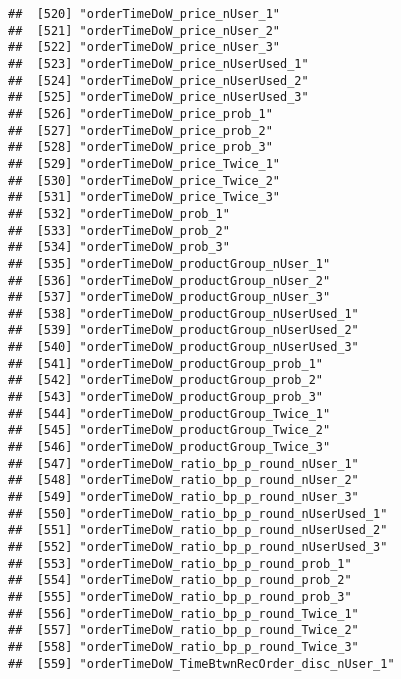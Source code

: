 \documentclass[10pt]{report}
\begin{document}
\begin{verbatim}
##  [520] "orderTimeDoW_price_nUser_1"                           
##  [521] "orderTimeDoW_price_nUser_2"                           
##  [522] "orderTimeDoW_price_nUser_3"                           
##  [523] "orderTimeDoW_price_nUserUsed_1"                       
##  [524] "orderTimeDoW_price_nUserUsed_2"                       
##  [525] "orderTimeDoW_price_nUserUsed_3"                       
##  [526] "orderTimeDoW_price_prob_1"                            
##  [527] "orderTimeDoW_price_prob_2"                            
##  [528] "orderTimeDoW_price_prob_3"                            
##  [529] "orderTimeDoW_price_Twice_1"                           
##  [530] "orderTimeDoW_price_Twice_2"                           
##  [531] "orderTimeDoW_price_Twice_3"                           
##  [532] "orderTimeDoW_prob_1"                                  
##  [533] "orderTimeDoW_prob_2"                                  
##  [534] "orderTimeDoW_prob_3"                                  
##  [535] "orderTimeDoW_productGroup_nUser_1"                    
##  [536] "orderTimeDoW_productGroup_nUser_2"                    
##  [537] "orderTimeDoW_productGroup_nUser_3"                    
##  [538] "orderTimeDoW_productGroup_nUserUsed_1"                
##  [539] "orderTimeDoW_productGroup_nUserUsed_2"                
##  [540] "orderTimeDoW_productGroup_nUserUsed_3"                
##  [541] "orderTimeDoW_productGroup_prob_1"                     
##  [542] "orderTimeDoW_productGroup_prob_2"                     
##  [543] "orderTimeDoW_productGroup_prob_3"                     
##  [544] "orderTimeDoW_productGroup_Twice_1"                    
##  [545] "orderTimeDoW_productGroup_Twice_2"                    
##  [546] "orderTimeDoW_productGroup_Twice_3"                    
##  [547] "orderTimeDoW_ratio_bp_p_round_nUser_1"                
##  [548] "orderTimeDoW_ratio_bp_p_round_nUser_2"                
##  [549] "orderTimeDoW_ratio_bp_p_round_nUser_3"                
##  [550] "orderTimeDoW_ratio_bp_p_round_nUserUsed_1"            
##  [551] "orderTimeDoW_ratio_bp_p_round_nUserUsed_2"            
##  [552] "orderTimeDoW_ratio_bp_p_round_nUserUsed_3"            
##  [553] "orderTimeDoW_ratio_bp_p_round_prob_1"                 
##  [554] "orderTimeDoW_ratio_bp_p_round_prob_2"                 
##  [555] "orderTimeDoW_ratio_bp_p_round_prob_3"                 
##  [556] "orderTimeDoW_ratio_bp_p_round_Twice_1"                
##  [557] "orderTimeDoW_ratio_bp_p_round_Twice_2"                
##  [558] "orderTimeDoW_ratio_bp_p_round_Twice_3"                
##  [559] "orderTimeDoW_TimeBtwnRecOrder_disc_nUser_1"           

\end{verbatim}
\end{document}
